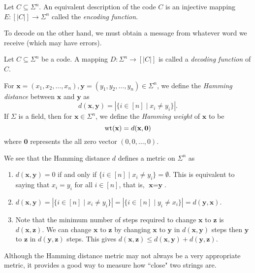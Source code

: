 \begin{definition}
    Let $C\subseteq\Sigma^n$. An equivalent description of the code $C$ is an injective mapping $E:[|C|]\to\Sigma^n$ called the \textit{encoding function}.
\end{definition}
 
To decode on the other hand, we must obtain a message from whatever word we receive (which may have errors).
 
\begin{definition}
    Let $C\subseteq\Sigma^n$ be a code. A mapping $D:\Sigma^n\to[|C|]$ is called a \textit{decoding function} of $C$.
\end{definition}


\begin{definition}
    For $\textbf{x}=(x_1,x_2,\ldots,x_n), \textbf{y}=(y_1,y_2,\ldots,y_n)\in\Sigma^n$, we define the \textit{Hamming distance} between $\textbf{x}$ and $\textbf{y}$ as
    $$d(\textbf{x},\textbf{y})=|\{i\in[n]\mid x_i\neq y_i\}|.$$
    If $\Sigma$ is a field, then for $\textbf{x}\in\Sigma^n$, we define the \textit{Hamming weight} of $\textbf{x}$ to be
    $$\operatorname{wt}(\textbf{x})=d(\textbf{x},\textbf{0})$$
    where $\textbf{0}$ represents the all zero vector $(0,0,\ldots,0)$.
\end{definition}

We see that the Hamming distance $d$ defines a metric on $\Sigma^n$ as
\begin{enumerate}
    \item $d(\textbf{x},\textbf{y})=0$ if and only if $\{i\in[n]\mid x_i\neq y_i\}=\emptyset$. This is equivalent to saying that $x_i=y_i$ for all $i\in[n]$, that is, $\textbf{x}=\textbf{y}$.
    \item $d(\textbf{x},\textbf{y})=|\{i\in[n]\mid x_i\neq y_i\}|=|\{i\in[n]\mid y_i\neq x_i\}|=d(\textbf{y},\textbf{x}).$
    \item Note that the minimum number of steps required to change $\textbf{x}$ to $\textbf{z}$ is $d(\textbf{x},\textbf{z})$. We can change $\textbf{x}$ to $\textbf{z}$ by changing $\textbf{x}$ to $\textbf{y}$ in $d(\textbf{x},\textbf{y})$ steps then $\textbf{y}$ to $\textbf{z}$ in $d(\textbf{y},\textbf{z})$ steps. This gives $d(\textbf{x},\textbf{z})\leq d(\textbf{x},\textbf{y})+d(\textbf{y},\textbf{z})$.
\end{enumerate}

Although the Hamming distance metric may not always be a very appropriate metric, it provides a good way to measure how ``close" two strings are.

